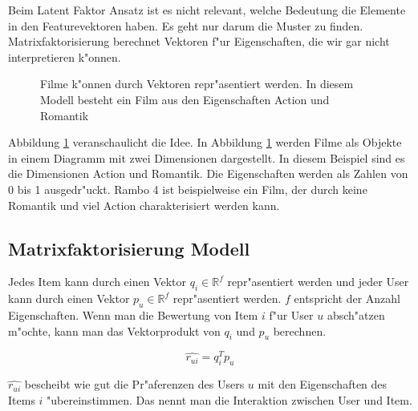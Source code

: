 \documentclass[a4paper, 12pt]{article}
\begin{document}
Beim Latent Faktor Ansatz ist es nicht relevant, welche Bedeutung die Elemente in den Featurevektoren haben. Es geht nur darum die Muster zu finden. Matrixfaktorisierung berechnet Vektoren f"ur Eigenschaften, die wir gar nicht interpretieren k"onnen.

\begin{figure}
\centering
{}
\caption{Filme k"onnen durch Vektoren repr"asentiert werden. In diesem Modell besteht ein Film aus den Eigenschaften Action und Romantik}
\label{fig:moviedimension}
\end{figure}

Abbildung \ref{fig:moviedimension} veranschaulicht die Idee. In Abbildung \ref{fig:moviedimension} werden Filme als Objekte in einem Diagramm mit zwei Dimensionen dargestellt. In diesem Beispiel sind es die Dimensionen Action und Romantik. Die Eigenschaften werden als Zahlen von 0 bis 1 ausgedr"uckt. Rambo 4 ist beispielweise ein Film, der durch keine Romantik und viel Action charakterisiert werden kann.

\subsection{Matrixfaktorisierung Modell}
\label{sec:matrixfactorizationmodel}

Jedes Item kann durch einen Vektor $q_i \in \mathbb{R}^f$ repr"asentiert werden und jeder User kann durch einen Vektor $p_u \in \mathbb{R}^f$ repr"asentiert werden. $f$ entspricht der Anzahl Eigenschaften. Wenn man die Bewertung von Item $i$ f"ur User $u$ absch"atzen m"ochte, kann man das Vektorprodukt von $q_i$ und $p_u$ berechnen.

\begin{equation}
  \label{eq:rui}
  \hat{r_{ui}} = q_i^T p_u
\end{equation}

$\hat{r_{ui}}$ bescheibt wie gut die Pr"aferenzen des Users $u$ mit den Eigenschaften des Items $i$ "ubereinstimmen. Das nennt man die Interaktion zwischen User und Item.
\end{document}

